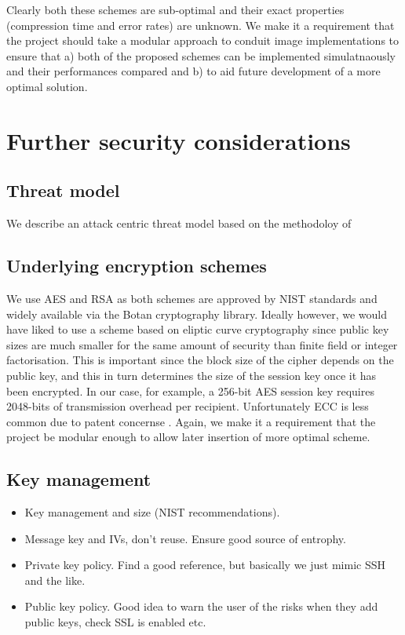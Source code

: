 Clearly both these schemes are sub-optimal and their exact properties (compression time and error rates) are unknown. We make it a requirement that the project should take a modular approach to conduit image implementations to ensure that a) both of the proposed schemes can be implemented simulatnaously and their performances compared and b) to aid future development of a more optimal solution.


    
\section{Further security considerations}

\subsection{Threat model}

We describe an attack centric threat model based on the methodoloy of \cite{XXX}



\subsection{Underlying encryption schemes}

We use AES and RSA as both schemes are approved by NIST standards \cite{nist} and widely available via the Botan cryptography library. Ideally however, we would have liked to use a scheme based on eliptic curve cryptography since public key sizes are much smaller for the same amount of security than finite field or integer factorisation. This is important since the block size of the cipher depends on the public key, and this in turn determines the size of the session key once it has been encrypted. In our case, for example, a 256-bit AES session key requires 2048-bits of transmission overhead per recipient. Unfortunately ECC is less common due to patent concernse \cite{XXX}. Again, we make it a requirement that the project be modular enough to allow later insertion of more optimal scheme.


\subsection{Key management}        
	
    
\begin{itemize}


    \item Key management and size (NIST recommendations).
    \item Message key and IVs, don't reuse. Ensure good source of entrophy.
    \item Private key policy. Find a good reference, but basically we just mimic SSH and the like.
    \item Public key policy. Good idea to warn the user of the risks when they add public keys, check SSL is enabled etc.
\end{itemize}


